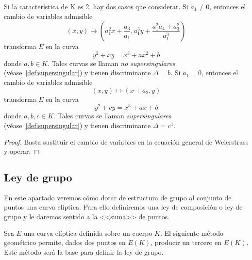 \begin{lema}\label{lm:ecuaciones curva eliptica caracteristica dos}
	Si la característica de K es 2, hay dos casos que considerar. Si $a_1 \neq 0$, entonces el cambio de variables admisible
	$$
	(x, y) \mapsto \left(a_1^2 x + \frac{a_3}{a_1}, a_1^3 y + \frac{a_1^2 a_4 + a_3^2}{a_1^3} \right)
	$$
	transforma $E$ en la curva
	\begin{equation*}
		y^2 + xy = x^3 + a x^2 + b
	\end{equation*}
	donde $a, b \in K$. Tales curvas se llaman \emph{no supersingulares} (véase~\ref{def:supersingular}) y tienen discriminante $\Delta = b$. Si $a_1 = 0$, entonces el cambio de variables admisible
	$$
	(x, y) \mapsto (x + a_2, y)
	$$
	transforma $E$ en la curva
	\begin{equation*}
		y^2 + c y = x^3 + a x + b
	\end{equation*}
	donde $a, b, c \in K$. Tales curvas se llaman \emph{supersingulares} (véase~\ref{def:supersingular}) y tienen discriminante $\Delta = c^4$.
\end{lema}
\begin{proof}
	Basta sustituir el cambio de variables en la ecuación general de Weierstrass y operar.
\end{proof}


\subsection{Ley de grupo}
\label{sub:Ley de grupo}

En este apartado veremos cómo dotar de estructura de grupo al conjunto de puntos una curva elíptica. Para ello definiremos una ley de composición o ley de grupo y le daremos sentido a la <<suma>> de puntos.

Sea $E$ una curva elíptica definida sobre un cuerpo $K$. El siguiente método geométrico permite, dados dos puntos en $E(K)$, producir un tercero en $E(K)$. Este método será la base para definir la ley de grupo.

